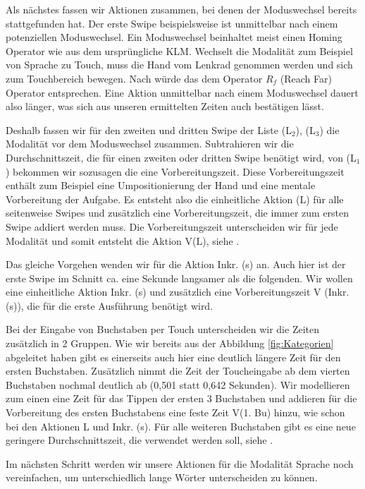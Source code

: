 Als nächstes fassen wir Aktionen zusammen, bei denen der Moduswechsel bereits stattgefunden hat. 
Der erste Swipe beispielsweise ist unmittelbar nach einem potenziellen Moduswechsel. 
Ein Moduswechsel beinhaltet meist einen Homing Operator wie aus dem ursprüngliche KLM. 
Wechselt die Modalität zum Beispiel von Sprache zu Touch, muss die Hand vom Lenkrad genommen werden und sich zum Touchbereich bewegen. 
Nach \citet{Green_2002} würde das dem Operator $R_f$ (Reach Far) Operator entsprechen. 
Eine Aktion unmittelbar nach einem Moduswechsel dauert also länger, was sich aus unseren ermittelten Zeiten auch bestätigen lässt. 

Deshalb fassen wir für den zweiten und dritten Swipe der Liste (L$_2$), (L$_3$) die Modalität vor dem Moduswechsel zusammen. Subtrahieren wir die Durchschnittszeit, die für einen zweiten oder dritten Swipe benötigt wird, von (L$_1$) bekommen wir sozusagen die eine Vorbereitungszeit. Diese Vorbereitungszeit enthält zum Beispiel eine Umpositionierung der Hand und eine mentale Vorbereitung der Aufgabe. Es entsteht also die einheitliche Aktion (L) für alle seitenweise Swipes und zusätzlich eine Vorbereitungszeit, die immer zum ersten Swipe addiert werden muss. Die Vorbereitungszeit unterscheiden wir für jede Modalität und somit entsteht die Aktion V(L), siehe .
 
Das gleiche Vorgehen wenden wir für die Aktion Inkr. (s) an. Auch hier ist der erste Swipe im Schnitt ca. eine Sekunde langsamer als die folgenden. Wir wollen eine einheitliche Aktion Inkr. (s) und zusätzlich eine Vorbereitungszeit V (Inkr. (s)), die für die erste Ausführung benötigt wird. 
 
Bei der Eingabe von Buchstaben per Touch unterscheiden wir die Zeiten zusätzlich in 2 Gruppen. 
Wie wir bereits aus der Abbildung \ref{fig:Kategorien} abgeleitet haben gibt es einerseits auch hier eine deutlich längere Zeit für den ersten Buchstaben. 
Zusätzlich nimmt die Zeit der Toucheingabe ab dem vierten Buchstaben nochmal deutlich ab (0,501 statt 0,642 Sekunden). 
Wir modellieren zum einen eine Zeit für das Tippen der ersten 3 Buchstaben und addieren für die Vorbereitung des ersten Buchstabens eine feste Zeit V(1. Bu) hinzu, wie schon bei den Aktionen L und Inkr. (s). 
Für alle weiteren Buchstaben gibt es eine neue geringere Durchschnittszeit, die verwendet werden soll, siehe .  

Im nächsten Schritt werden wir unsere Aktionen für die Modalität Sprache noch vereinfachen, um unterschiedlich lange Wörter unterscheiden zu können. 

